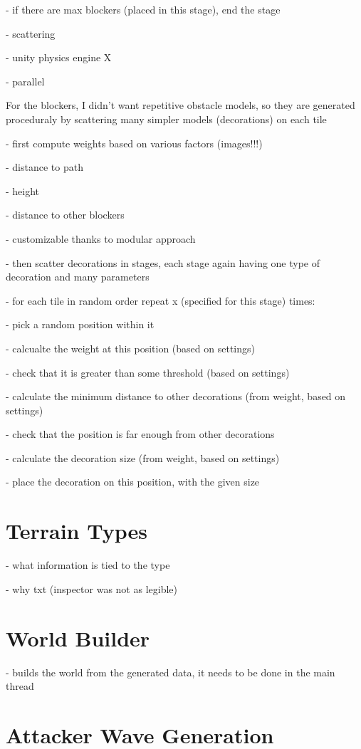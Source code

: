 - if there are max blockers (placed in this stage), end the stage

- scattering

- unity physics engine X

- parallel

For the blockers, I didn't want repetitive obstacle models, so they are generated proceduraly by scattering many simpler models (decorations) on each tile

- first compute weights based on various factors (images!!!)

- distance to path

- height

- distance to other blockers

- customizable thanks to modular approach

- then scatter decorations in stages, each stage again having one type of decoration and many parameters

- for each tile in random order repeat x (specified for this stage) times:

- pick a random position within it

- calcualte the weight at this position (based on settings)

- check that it is greater than some threshold (based on settings)

- calculate the minimum distance to other decorations (from weight, based on settings)

- check that the position is far enough from other decorations

- calculate the decoration size (from weight, based on settings)

- place the decoration on this position, with the given size

\section{Terrain Types}

- what information is tied to the type

- why txt (inspector was not as legible)

\section{World Builder}

- builds the world from the generated data, it needs to be done in the main thread

\section{Attacker Wave Generation}

